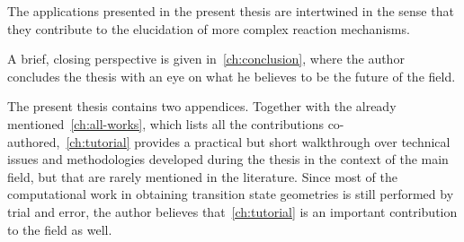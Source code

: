 The applications presented in the present thesis are intertwined in the sense
that they contribute to the elucidation of more complex reaction mechanisms.

A brief, closing perspective is given in~\cref{ch:conclusion}, where
the author concludes the thesis with an eye on what he believes to be the
future of the field.

The present thesis contains two appendices.
Together with the already mentioned~\cref{ch:all-works}, which lists all
the contributions co-authored,~\cref{ch:tutorial} provides a practical but
short walkthrough over technical issues and methodologies developed during the
thesis in the context of the main field, but that are rarely mentioned in the
literature.
Since most of the computational work in obtaining transition state geometries
is still performed by trial and error, the author believes that~\cref{ch:tutorial} is an important contribution to the field as well.
